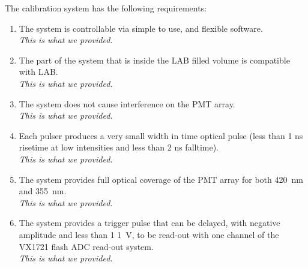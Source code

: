

The calibration system has the following requirements:

\begin{enumerate}
\item The system is controllable via simple to use, and flexible software.\\ 
\emph{This is what we provided.} 
\item The part of the system that is inside the LAB filled volume is compatible with LAB.\\ 
\emph{This is what we provided.} 
\item The system does not cause interference on the PMT array.\\ 
\emph{This is what we provided.} 
\item Each pulser produces a very small width in time optical pulse (less than 1 ns risetime at low intensities and less than 2 ns falltime).\\ 
\emph{This is what we provided.} 
\item The system provides full optical coverage of the PMT array for both 420~nm and 355~nm.\\ 
\emph{This is what we provided.} 
\item The system provides a trigger pulse that can be delayed, with negative amplitude and less than 1 1~V, to be read-out with one channel of the VX1721 flash ADC read-out system.\\ 
\emph{This is what we provided.}
\end{enumerate}